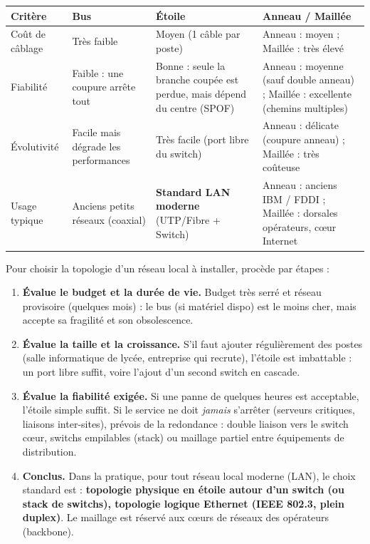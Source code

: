 \documentclass[11pt]{article}
\begin{document}
\begin{center}
\begin{tabularx}{\linewidth}{|l|X|X|X|}
\hline
\rowcolor{popblueL}
\textbf{Critère} & \textbf{Bus} & \textbf{Étoile} & \textbf{Anneau / Maillée} \\
\hline
Coût de câblage & Très faible & Moyen (1 câble par poste) & Anneau : moyen ; Maillée : très élevé \\
\hline
Fiabilité & Faible : une coupure arrête tout & Bonne : seule la branche coupée est perdue, mais dépend du centre (SPOF) & Anneau : moyenne (sauf double anneau) ; Maillée : excellente (chemins multiples) \\
\hline
Évolutivité & Facile mais dégrade les performances & Très facile (port libre du switch) & Anneau : délicate (coupure anneau) ; Maillée : très coûteuse \\
\hline
Usage typique & Anciens petits réseaux (coaxial) & \textbf{Standard LAN moderne} (UTP/Fibre + Switch) & Anneau : anciens IBM / FDDI ; Maillée : dorsales opérateurs, cœur Internet \\
\hline
\end{tabularx}
\end{center}

\begin{methode}
Pour choisir la topologie d'un réseau local à installer, procède par étapes :
\begin{enumerate}
\item \textbf{Évalue le budget et la durée de vie.} Budget très serré et réseau provisoire (quelques mois) : le bus (si matériel dispo) est le moins cher, mais accepte sa fragilité et son obsolescence.
\item \textbf{Évalue la taille et la croissance.} S'il faut ajouter régulièrement des postes (salle informatique de lycée, entreprise qui recrute), l'étoile est imbattable : un port libre suffit, voire l'ajout d'un second switch en cascade.
\item \textbf{Évalue la fiabilité exigée.} Si une panne de quelques heures est acceptable, l'étoile simple suffit. Si le service ne doit \emph{jamais} s'arrêter (serveurs critiques, liaisons inter-sites), prévois de la redondance : double liaison vers le switch cœur, switchs empilables (stack) ou maillage partiel entre équipements de distribution.
\item \textbf{Conclus.} Dans la pratique, pour tout réseau local moderne (LAN), le choix standard est : \textbf{topologie physique en étoile autour d'un switch (ou stack de switchs), topologie logique Ethernet (IEEE 802.3, plein duplex)}. Le maillage est réservé aux cœurs de réseaux des opérateurs (backbone).
\end{enumerate}
\end{methode}
\end{document}
